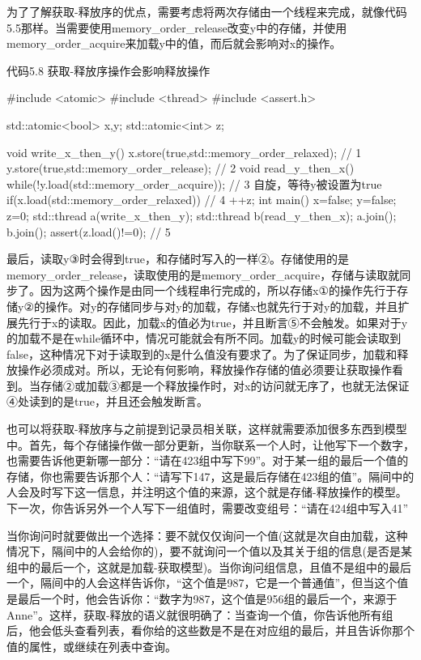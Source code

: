 为了了解获取-释放序的优点，需要考虑将两次存储由一个线程来完成，就像代码5.5那样。当需要使用memory\_order\_release改变y中的存储，并使用memory\_order\_acquire来加载y中的值，而后就会影响对x的操作。

代码5.8 获取-释放序操作会影响释放操作

\begin{cpp}
#include <atomic>
#include <thread>
#include <assert.h>

std::atomic<bool> x,y;
std::atomic<int> z;

void write_x_then_y()
{
  x.store(true,std::memory_order_relaxed);  // 1
  y.store(true,std::memory_order_release);  // 2
}
void read_y_then_x()
{
  while(!y.load(std::memory_order_acquire));  // 3 自旋，等待y被设置为true
  if(x.load(std::memory_order_relaxed))  // 4
    ++z;
}
int main()
{
  x=false;
  y=false;
  z=0;
  std::thread a(write_x_then_y);
  std::thread b(read_y_then_x);
  a.join();
  b.join();
  assert(z.load()!=0);  // 5
}
\end{cpp}

最后，读取y③时会得到true，和存储时写入的一样②。存储使用的是memory\_order\_release，读取使用的是memory\_order\_acquire，存储与读取就同步了。因为这两个操作是由同一个线程串行完成的，所以存储x①的操作先行于存储y②的操作。对y的存储同步与对y的加载，存储x也就先行于对y的加载，并且扩展先行于x的读取。因此，加载x的值必为true，并且断言⑤不会触发。如果对于y的加载不是在while循环中，情况可能就会有所不同。加载y的时候可能会读取到false，这种情况下对于读取到的x是什么值没有要求了。为了保证同步，加载和释放操作必须成对。所以，无论有何影响，释放操作存储的值必须要让获取操作看到。当存储②或加载③都是一个释放操作时，对x的访问就无序了，也就无法保证④处读到的是true，并且还会触发断言。

也可以将获取-释放序与之前提到记录员相关联，这样就需要添加很多东西到模型中。首先，每个存储操作做一部分更新，当你联系一个人时，让他写下一个数字，也需要告诉他更新哪一部分：“请在423组中写下99”。对于某一组的最后一个值的存储，你也需要告诉那个人：“请写下147，这是最后存储在423组的值”。隔间中的人会及时写下这一信息，并注明这个值的来源，这个就是存储-释放操作的模型。下一次，你告诉另外一个人写下一组值时，需要改变组号：“请在424组中写入41”

当你询问时就要做出一个选择：要不就仅仅询问一个值(这就是次自由加载，这种情况下，隔间中的人会给你的)，要不就询问一个值以及其关于组的信息(是否是某组中的最后一个，这就是加载-获取模型)。当你询问组信息，且值不是组中的最后一个，隔间中的人会这样告诉你，“这个值是987，它是一个普通值”，但当这个值是最后一个时，他会告诉你：“数字为987，这个值是956组的最后一个，来源于Anne”。这样，获取-释放的语义就很明确了：当查询一个值，你告诉他所有组后，他会低头查看列表，看你给的这些数是不是在对应组的最后，并且告诉你那个值的属性，或继续在列表中查询。


